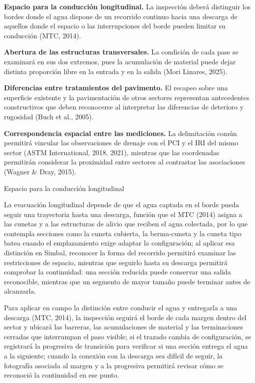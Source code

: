
\begin{listaTrasTitulo}
\item \textbf{Espacio para la conducción longitudinal.} La inspección deberá distinguir los bordes donde el agua dispone de un recorrido continuo hacia una descarga de aquellos donde el espacio o las interrupciones del borde pueden limitar su conducción (MTC, 2014).
\item \textbf{Abertura de las estructuras transversales.} La condición de cada pase se examinará en sus dos extremos, pues la acumulación de material puede dejar distinta proporción libre en la entrada y en la salida (Mori Linares, 2025).
\item \textbf{Diferencias entre tratamientos del pavimento.} El recapeo sobre una superficie existente y la pavimentación de otros sectores representan antecedentes constructivos que deben reconocerse al interpretar las diferencias de deterioro y rugosidad (Buch et al., 2005).
\item \textbf{Correspondencia espacial entre las mediciones.} La delimitación común permitirá vincular las observaciones de drenaje con el PCI y el IRI del mismo sector (ASTM International, 2018, 2021), mientras que las coordenadas permitirán considerar la proximidad entre sectores al contrastar las asociaciones (Wagner \& Dray, 2015).
\end{listaTrasTitulo}

  {Espacio para la conducción longitudinal}

La evacuación longitudinal depende de que el agua captada en el borde pueda seguir una trayectoria hasta una descarga, función que el MTC (2014) asigna a las cunetas y a las estructuras de alivio que reciben el agua colectada, por lo que contempla secciones como la cuneta cubierta, la berma-cuneta y la cuneta tipo batea cuando el emplazamiento exige adaptar la configuración; al aplicar esa distinción en Simbal, reconocer la forma del recorrido permitirá examinar las restricciones de espacio, mientras que seguirlo hasta su descarga permitirá comprobar la continuidad: una sección reducida puede conservar una salida reconocible, mientras que un segmento de mayor tamaño puede terminar antes de alcanzarla.

Para aplicar en campo la distinción entre conducir el agua y entregarla a una descarga (MTC, 2014), la inspección seguirá el borde de cada margen dentro del sector y ubicará las barreras, las acumulaciones de material y las terminaciones cerradas que interrumpan el paso visible; si el trazado cambia de configuración, se registrará la progresiva de transición para verificar si una sección entrega el agua a la siguiente; cuando la conexión con la descarga sea difícil de seguir, la fotografía asociada al margen y a la progresiva permitirá revisar cómo se reconoció la continuidad en ese punto.

